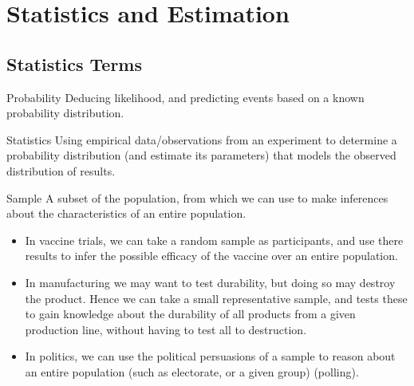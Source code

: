 \chapter{Statistics and Estimation}

\section{Statistics Terms}
\begin{definitionbox}{Probability}
	Deducing likelihood, and predicting events based on a known probability distribution.
\end{definitionbox}
\begin{definitionbox}{Statistics}
	Using empirical data/observations from an experiment to determine a probability distribution (and estimate its parameters) that models the observed distribution of results.
\end{definitionbox}
\begin{definitionbox}{Sample}
	A subset of the population, from which we can use  to make inferences about the characteristics of an entire population.
	\begin{itemize}
		\item In vaccine trials, we can take a random sample as participants, and use there results to infer the possible efficacy of the vaccine over an entire population.
		\item In manufacturing we may want to test durability, but doing so may destroy the product. Hence we can take a small representative sample, and tests these to gain knowledge about the durability of all products from a given production line, without having to test all to destruction.
		\item In politics, we can use the political persuasions of a sample to reason about an entire population (such as electorate, or a given group) (polling).
	\end{itemize}
\end{definitionbox}
